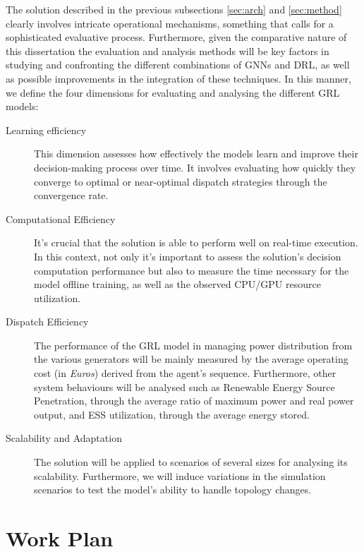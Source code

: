 The solution described in the previous subsections \ref{sec:arch} and \ref{sec:method} clearly involves intricate operational mechanisms, something that calls for a sophisticated evaluative process. Furthermore, given the comparative nature of this dissertation the evaluation and analysis methods will be key factors in studying and confronting the different combinations of \acp{GNN} and \ac{DRL}, as well as possible improvements in the integration of these techniques.
In this manner, we define the four dimensions for evaluating and analysing the different \ac{GRL} models:

\begin{description}
	\item[Learning efficiency] This dimension assesses how effectively the models learn and improve their decision-making process over time. It involves evaluating how quickly they converge to optimal or near-optimal dispatch strategies through the convergence rate. 
	
	\item[Computational Efficiency] It's crucial that the solution is able to perform well on real-time execution. In this context, not only it's important to assess the solution's decision computation performance but also to measure the time necessary for the model offline training, as well as the observed CPU/GPU resource utilization.
	
	\item[Dispatch Efficiency] The performance of the \ac{GRL} model in managing power distribution from the various generators will be mainly measured by the average operating cost (in \textit{Euros}) derived from the agent's sequence. Furthermore, other system behaviours will be analysed such as Renewable Energy Source Penetration, through the average ratio of maximum power and real power output, and \ac{ESS} utilization, through the average energy stored.
	
	\item[Scalability and Adaptation]  The solution will be applied to scenarios of several sizes for analysing its scalability. Furthermore, we will induce variations in the simulation scenarios to test the model's ability to handle topology changes.
\end{description}

\section{Work Plan} \label{sec:work-plan}


